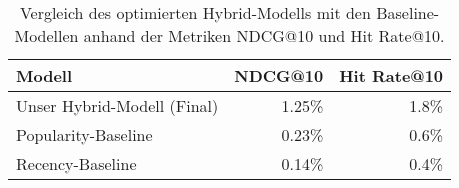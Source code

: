 
\begin{table}[htbp]
    \centering
    \caption{Vergleich des optimierten Hybrid-Modells mit den Baseline-Modellen anhand der Metriken NDCG@10 und Hit Rate@10.}
    \label{tab:baseline_vergleich}
    \begin{tabular}{lrr}
        \toprule
        \textbf{Modell} & \textbf{NDCG@10} & \textbf{Hit Rate@10} \\
        \midrule
        Unser Hybrid-Modell (Final) & 1.25\% & 1.8\% \\
        Popularity-Baseline        & 0.23\% & 0.6\% \\
        Recency-Baseline           & 0.14\% & 0.4\% \\
        \bottomrule
    \end{tabular}
\end{table}